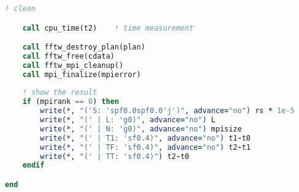 \begin{lstlisting}[language=Fortran, caption={Parallel F90 implementation of the FFT test case.}]
    ! clean

    call cpu_time(t2)    ! time measurement

    call fftw_destroy_plan(plan)
    call fftw_free(cdata)
    call fftw_mpi_cleanup()
    call mpi_finalize(mpierror)
    
    ! show the result
    if (mpirank == 0) then
        write(*, "('S: 'spf0.0spf0.0'j')", advance="no") rs * 1e-5
        write(*, "(' | L: 'g0)", advance="no") L
        write(*, "(' | N: 'g0)", advance="no") mpisize
        write(*, "(' | T1: 'sf0.4)", advance="no") t1-t0
        write(*, "(' | TF: 'sf0.4)", advance="no") t2-t1
        write(*, "(' | TT: 'sf0.4)") t2-t0
    endif

end
\end{lstlisting}




